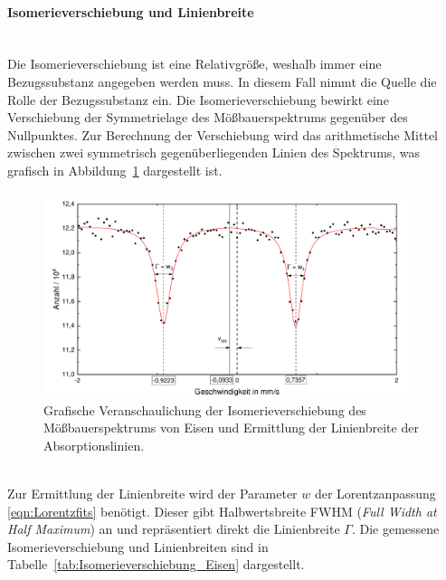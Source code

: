 \documentclass[a4paper,twoside,final]{article}
\begin{document}
\paragraph{Isomerieverschiebung und Linienbreite}$~$\\
Die Isomerieverschiebung ist eine Relativgröße, weshalb immer eine Bezugssubstanz angegeben werden muss. In diesem Fall nimmt die Quelle die Rolle der Bezugssubstanz ein. Die Isomerieverschiebung bewirkt eine Verschiebung der Symmetrielage des Mößbauerspektrums gegenüber des Nullpunktes. Zur Berechnung der Verschiebung wird das arithmetische Mittel zwischen zwei symmetrisch gegenüberliegenden Linien des Spektrums, was grafisch in Abbildung~\ref{fig:Eisen_Isomerieverschiebung} dargestellt ist.
\begin{figure}[htp]
    \centering
    \vspace{-0.5cm}
    \includegraphics[width=0.95\textwidth]{Bilder/Eisen_Isomerieverschiebung.pdf}
    \caption{Grafische Veranschaulichung der Isomerieverschiebung des Mößbauerspektrums von Eisen und Ermittlung der Linienbreite der Absorptionslinien.}
    \label{fig:Eisen_Isomerieverschiebung}
\end{figure}\\
Zur Ermittlung der Linienbreite wird der Parameter $w$ der Lorentzanpassung \eqref{eqn:Lorentzfits} benötigt. Dieser gibt Halbwertsbreite FWHM (\textit{Full Width at Half Maximum}) an und repräsentiert direkt die Linienbreite $\Gamma$. Die gemessene Isomerieverschiebung und Linienbreiten sind in Tabelle~\ref{tab:Isomerieverschiebung_Eisen} dargestellt.
\end{document}
